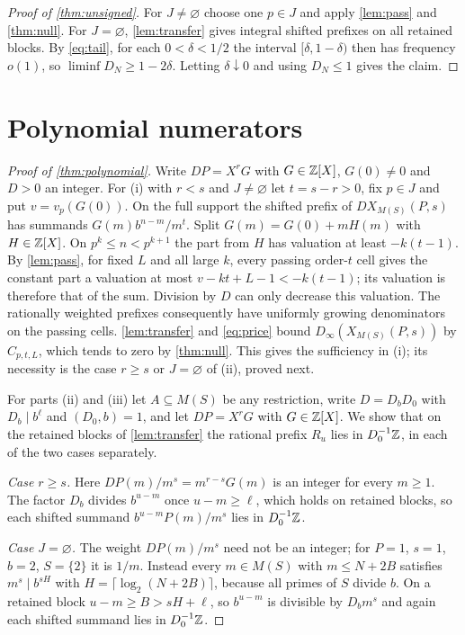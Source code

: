 \documentclass[11pt]{article}
\newcommand{\Dinf}{D_{\infty}}
\begin{document}
\begin{proof}[Proof of \cref{thm:unsigned}]
For $J\ne\varnothing$ choose one $p\in J$ and apply \cref{lem:pass} and \cref{thm:null}. For $J=\varnothing$, \cref{lem:transfer} gives integral shifted prefixes on all retained blocks. By \eqref{eq:tail}, for each $0<\delta<1/2$ the interval $[\delta,1-\delta)$ then has frequency $o(1)$, so $\liminf D_N\ge1-2\delta$. Letting $\delta\downarrow0$ and using $D_N\le1$ gives the claim.
\end{proof}

\section{Polynomial numerators}\label{sec:poly}
\begin{proof}[Proof of \cref{thm:polynomial}]
Write $DP=X^rG$ with $G\in\mathbb Z[X]$, $G(0)\ne0$ and $D>0$ an integer. For (i) with $r<s$ and $J\ne\varnothing$ let $t=s-r>0$, fix $p\in J$ and put $v=v_p(G(0))$. On the full support the shifted prefix of $DX_{M(S)}(P,s)$ has summands $G(m)b^{n-m}/m^t$. Split $G(m)=G(0)+mH(m)$ with $H\in\mathbb Z[X]$. On $p^k\le n<p^{k+1}$ the part from $H$ has valuation at least $-k(t-1)$. By \cref{lem:pass}, for fixed $L$ and all large $k$, every passing order-$t$ cell gives the constant part a valuation at most $v-kt+L-1<-k(t-1)$; its valuation is therefore that of the sum. Division by $D$ can only decrease this valuation. The rationally weighted prefixes consequently have uniformly growing denominators on the passing cells. \cref{lem:transfer} and \eqref{eq:price} bound $\Dinf(X_{M(S)}(P,s))$ by $C_{p,t,L}$, which tends to zero by \cref{thm:null}. This gives the sufficiency in (i); its necessity is the case $r\ge s$ or $J=\varnothing$ of (ii), proved next.

For parts (ii) and (iii) let $A\subseteq M(S)$ be any restriction, write $D=D_bD_0$ with $D_b\mid b^\ell$ and $(D_0,b)=1$, and let $DP=X^rG$ with $G\in\mathbb Z[X]$. We show that on the retained blocks of \cref{lem:transfer} the rational prefix $R_u$ lies in $D_0^{-1}\mathbb Z$, in each of the two cases separately.

\emph{Case $r\ge s$.} Here $DP(m)/m^s=m^{r-s}G(m)$ is an integer for every $m\ge1$. The factor $D_b$ divides $b^{u-m}$ once $u-m\ge\ell$, which holds on retained blocks, so each shifted summand $b^{u-m}P(m)/m^s$ lies in $D_0^{-1}\mathbb Z$.

\emph{Case $J=\varnothing$.} The weight $DP(m)/m^s$ need not be an integer; for $P=1$, $s=1$, $b=2$, $S=\{2\}$ it is $1/m$. Instead every $m\in M(S)$ with $m\le N+2B$ satisfies $m^s\mid b^{sH}$ with $H=\lceil\log_2(N+2B)\rceil$, because all primes of $S$ divide $b$. On a retained block $u-m\ge B>sH+\ell$, so $b^{u-m}$ is divisible by $D_bm^s$ and again each shifted summand lies in $D_0^{-1}\mathbb Z$.


\end{proof}
\end{document}
